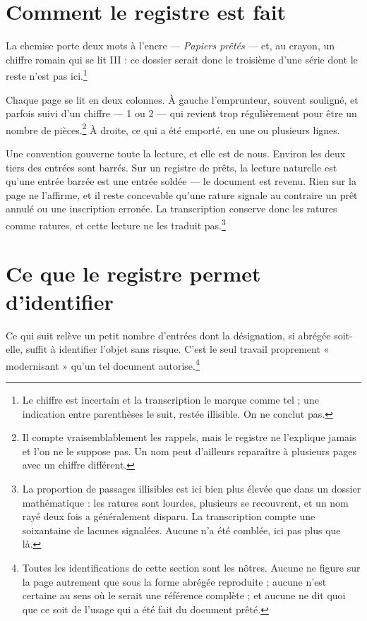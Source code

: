 \documentclass[11pt,a4paper]{article}
\begin{document}
\section*{Comment le registre est fait}

La chemise porte deux mots à l'encre --- \emph{Papiers prêtés} --- et, au
crayon, un chiffre romain qui se lit III : ce dossier serait donc le troisième
d'une série dont le reste n'est pas ici.\footnote{Le chiffre est incertain et la
transcription le marque comme tel ; une indication entre parenthèses le suit,
restée illisible. On ne conclut pas.}

Chaque page se lit en deux colonnes. À gauche l'emprunteur, souvent souligné,
et parfois suivi d'un chiffre --- 1 ou 2 --- qui revient trop régulièrement pour
être un nombre de pièces.\footnote{Il compte vraisemblablement les rappels, mais
le registre ne l'explique jamais et l'on ne le suppose pas. Un nom peut
d'ailleurs reparaître à plusieurs pages avec un chiffre différent.} À droite,
ce qui a été emporté, en une ou plusieurs lignes.

Une convention gouverne toute la lecture, et elle est de nous. Environ les deux
tiers des entrées sont barrés. Sur un registre de prêts, la lecture naturelle
est qu'une entrée barrée est une entrée soldée --- le document est revenu. Rien
sur la page ne l'affirme, et il reste concevable qu'une rature signale au
contraire un prêt annulé ou une inscription erronée. La transcription conserve
donc les ratures comme ratures, et cette lecture ne les traduit pas.\footnote{La
proportion de passages illisibles est ici bien plus élevée que dans un dossier
mathématique : les ratures sont lourdes, plusieurs se recouvrent, et un nom rayé
deux fois a généralement disparu. La transcription compte une soixantaine de
lacunes signalées. Aucune n'a été comblée, ici pas plus que là.}

\section*{Ce que le registre permet d'identifier}

Ce qui suit relève un petit nombre d'entrées dont la désignation, si abrégée
soit-elle, suffit à identifier l'objet sans risque. C'est le seul travail
proprement « modernisant » qu'un tel document autorise.\footnote{Toutes les
identifications de cette section sont les nôtres. Aucune ne figure sur la page
autrement que sous la forme abrégée reproduite ; aucune n'est certaine au sens
où le serait une référence complète ; et aucune ne dit quoi que ce soit de
l'usage qui a été fait du document prêté.}
\end{document}
